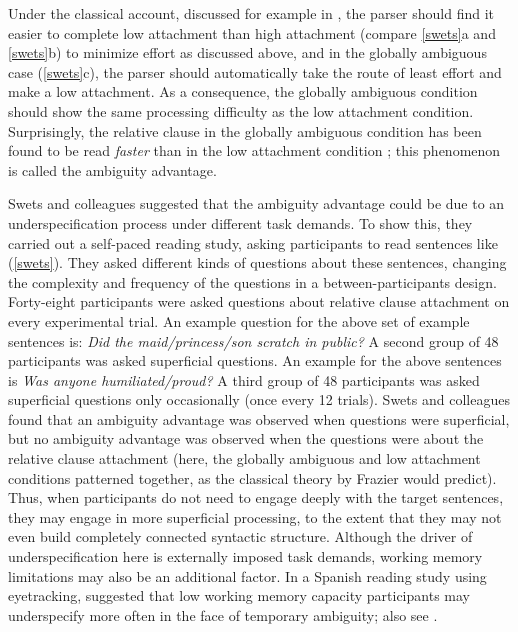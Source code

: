 \documentclass{cambridge7A}\usepackage[]{graphicx}\usepackage[]{color}
\begin{document}
Under the classical account, discussed for example in
\cite{FrazierRayner1982}, the parser should find it easier to complete  
low attachment than high attachment (compare \ref{swets}a and
\ref{swets}b) to minimize effort as discussed above, and in the
globally ambiguous case (\ref{swets}c), the parser should
automatically take the route of least effort and make a low
attachment. As a consequence, the globally ambiguous condition should
show the same processing difficulty as the low attachment 
condition. Surprisingly, the relative clause in the globally ambiguous
condition has been found to be read \textit{faster} than in the low
attachment condition \citep{TraxlerPickeringClifton1998}; this 
phenomenon is called the ambiguity advantage.

Swets and colleagues suggested that the ambiguity advantage could be
due to an underspecification process under different task demands.  To
show this, they carried out a self-paced reading study, asking
participants to read sentences like (\ref{swets}). They asked different
kinds of questions about these sentences, changing the complexity and
frequency of the questions in a between-participants
design. Forty-eight participants were asked questions about relative
clause attachment on every experimental trial. An example question for
the above set of example sentences is: \textit{Did the
maid/princess/son scratch in public?} A second group of 48
participants was asked superficial questions. An example for the above
sentences is \textit{Was anyone humiliated/proud?} A third group of
48 participants was asked superficial questions only occasionally
(once every 12 trials). Swets and colleagues found that an ambiguity
advantage was observed when questions were superficial, but no
ambiguity advantage was observed when the questions were about the
relative clause attachment (here, the globally ambiguous and low
attachment conditions patterned together, as the classical theory by
Frazier would predict). Thus, when participants do not need to engage
deeply with the target sentences, they may engage in more superficial
processing, to the extent that they may not even build completely
connected syntactic structure.  Although the driver of
underspecification here is externally imposed task demands, working memory limitations 
may also be an additional factor. In a Spanish reading study using
eyetracking, \cite{MalsburgVasishth2013} suggested that low working
memory capacity participants may underspecify more often in the face of temporary ambiguity; also see \cite{Traxler2007}.
\end{document}
